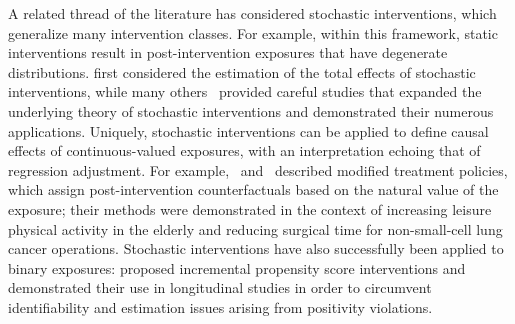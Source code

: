 A related thread of the literature has considered stochastic interventions,
which generalize many intervention classes. For example, within this framework,
static interventions result in post-intervention exposures that have degenerate
distributions. \citet{stock1989nonparametric} first considered the estimation of
the total effects of stochastic interventions, while many
others~\citep[e.g.,][]{robins2004effects, didelez2006direct,
tian2008identifying, pearl2009myth, stitelman2010impact, haneuse2013estimation,
diaz2013assessing, dudik2014doubly, young2014identification} provided careful
studies that expanded the underlying theory of stochastic interventions and
demonstrated their numerous applications. Uniquely, stochastic interventions can
be applied to define causal effects of continuous-valued exposures, with an
interpretation echoing that of regression adjustment. For
example,~\citet{diaz2012population} and~\citet{haneuse2013estimation} described
modified treatment policies, which assign post-intervention counterfactuals
based on the natural value of the exposure; their methods were demonstrated in
the context of increasing leisure physical activity in the elderly and reducing
surgical time for non-small-cell lung cancer operations. Stochastic
interventions have also successfully been applied to binary exposures:
\citet{kennedy2019nonparametric} proposed incremental propensity score
interventions and demonstrated their use in longitudinal studies in order to
circumvent identifiability and estimation issues arising from positivity
violations.

